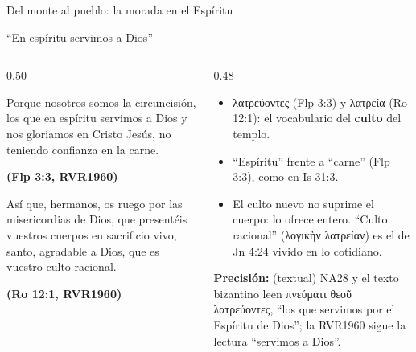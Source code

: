 \documentclass[hyperref={bookmarks=false},aspectratio=169]{beamer}
\newcommand{\grc}[1]{\foreignlanguage{ancientgreek}{#1}}
\newcommand{\fuente}[1]{\par\hfill{\upshape\bfseries\footnotesize\textcolor{azul}{#1}}}
\newcommand{\destacar}[1]{\textbf{\textcolor{azul}{#1}}}
\newcommand{\precision}[1]{{\footnotesize\color{gris}\textbf{Precisión:} #1}}
\begin{document}
\begin{frame}{Del monte al pueblo: la morada en el Espíritu}
\centering
{}
\end{frame}

\begin{frame}{``En espíritu servimos a Dios''}
\begin{columns}[t,onlytextwidth]
\begin{column}{0.50\textwidth}
\begin{cita}Porque nosotros somos la circuncisión, los que en espíritu servimos a Dios y nos gloriamos en Cristo Jesús, no teniendo confianza en la carne.\fuente{(Flp 3:3, RVR1960)}\end{cita}
\begin{cita}Así que, hermanos, os ruego por las misericordias de Dios, que presentéis vuestros cuerpos en sacrificio vivo, santo, agradable a Dios, que es vuestro culto racional.\fuente{(Ro 12:1, RVR1960)}\end{cita}
\end{column}
\begin{column}{0.48\textwidth}\small
\begin{itemize}
\item \grc{λατρεύοντες} (Flp 3:3) y \grc{λατρεία} (Ro 12:1): el vocabulario del \destacar{culto} del templo.
\item ``Espíritu'' frente a ``carne'' (Flp 3:3), como en Is 31:3.
\item El culto nuevo no suprime el cuerpo: lo ofrece entero. ``Culto racional'' (\grc{λογικὴν λατρείαν}) es el de Jn 4:24 vivido en lo cotidiano.
\end{itemize}
\precision{(textual) NA28 y el texto bizantino leen \grc{πνεύματι θεοῦ λατρεύοντες}, ``los que servimos por el Espíritu de Dios''; la RVR1960 sigue la lectura ``servimos a Dios''.}
\end{column}
\end{columns}
\end{frame}
\end{document}
